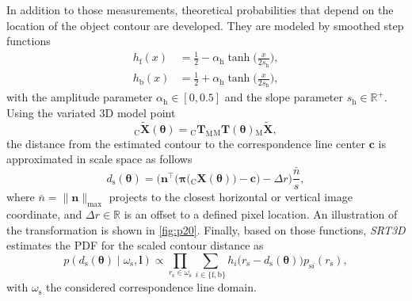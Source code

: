 \documentclass[10pt,twocolumn,letterpaper]{article}
\begin{document}
In addition to those measurements, theoretical probabilities that depend on the location of the object contour are developed.
They are modeled by smoothed step functions 
\begin{align}\label{eq:p23}
	h_\textrm{f}(x) &= \frac{1}{2} - \alpha_\textrm{h}\tanh\bigg(\frac{x}{2s_\textrm{h}}\bigg),\\\label{eq:p24}
	h_\textrm{b}(x) &= \frac{1}{2} + \alpha_\textrm{h}\tanh\bigg(\frac{x}{2s_\textrm{h}}\bigg),
\end{align}
with the amplitude parameter $\alpha_\textrm{h} \in [0,0.5]$ and the slope parameter $s_\textrm{h} \in \mathbb{R}^+$.
Using the variated 3D model point
\begin{equation} \label{eq:p20}
	{}_\textrm{C}\pmb{\widetilde{X}}(\pmb{\theta}) = {}_\textrm{C}\pmb{T}_\textrm{M}{}_\textrm{M}\pmb{T}(\pmb{\theta}){}_\textrm{M}\pmb{\widetilde{X}},
\end{equation}
the distance from the estimated contour to the correspondence line center $\pmb{c}$ is approximated in scale space as follows
\begin{equation} \label{eq:p21}
	d_\textrm{s}(\pmb{\theta}) = \bigg(\pmb{n}^\top\Big(\pmb{\pi}\big({}_\textrm{C}\pmb{X}(\pmb{\theta})\big) - \pmb{c}\Big)-\Delta r\bigg) \frac{\bar{n}}{s},
\end{equation}
where $\bar{n} = \lVert\pmb{n}\rVert_\mathrm{max}$ projects to the closest horizontal or vertical image coordinate, and $\Delta r \in \mathbb{R}$ is an offset to a defined pixel location.
An illustration of the transformation is shown in \cref{fig:p20}.
Finally, based on those functions, \textit{SRT3D} estimates the \ac{PDF} for the scaled contour distance as
\begin{equation}\label{eq:p25}
	p(d_\textrm{s}(\pmb{\theta})\mid \omega_\textrm{s},\pmb{l}) \propto \prod_{r_\textrm{s}\in\omega_\textrm{s}}
	\sum_{i \in \{\textrm{f}, \textrm{b}\}}
	h_i\big(r_\textrm{s}-d_\textrm{s}(\pmb{\theta})\big)p_{\textrm{s}i}(r_\textrm{s}),
\end{equation}
with $\omega_\textrm{s}$ the considered correspondence line domain.
\end{document}
